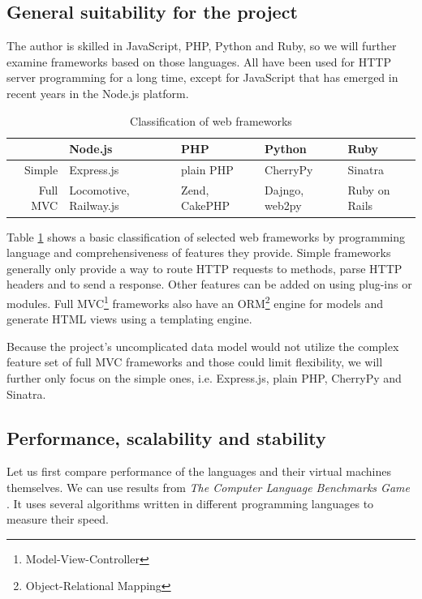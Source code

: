 \documentclass[12pt,oneside]{fithesis}
\begin{document}
	\subsection{General suitability for the project}
		The author is skilled in JavaScript, PHP, Python and Ruby, so we will further examine frameworks based on those languages. All have been used for HTTP server programming for a long time, except for JavaScript that has emerged in recent years in the Node.js platform.\\
		\begin{table}[htb]
		\begin{tabular}{|r||p{2.2cm}|p{2.2cm}|p{2.1cm}|p{2.2cm}|}
			\hline 
			\rule[-1ex]{0pt}{2.5ex} & Node.js & PHP & Python & Ruby \\ 
			\hline\hline
			\rule[-1ex]{0pt}{2.5ex} Simple & Express.js & plain PHP & CherryPy & Sinatra \\ 
			\hline 
			\rule[-1ex]{0pt}{2.5ex} Full MVC & Locomotive, Railway.js & Zend, CakePHP & Dajngo, web2py & Ruby on Rails \\ 
			\hline 
		\end{tabular}
		\caption{Classification of web frameworks}
		\label{table:wf}
		\end{table}
	
		Table \ref{table:wf} shows a basic classification of selected web frameworks by programming language and comprehensiveness of features they provide. Simple frameworks generally only provide a way to route HTTP requests to methods, parse HTTP headers and to send a response. Other features can be added on using plug-ins or modules. Full MVC\footnote{Model-View-Controller} frameworks also have an ORM\footnote{Object-Relational Mapping} engine for models and generate HTML views using a templating engine.
		
		Because the project's uncomplicated data model would not utilize the complex feature set of full MVC frameworks and those could limit flexibility, we will further only focus on the simple ones, i.e. Express.js, plain PHP, CherryPy and Sinatra.
		
	\subsection{Performance, scalability and stability}
		Let us first compare performance of the languages and their virtual machines themselves. We can use results from \emph{The Computer Language Benchmarks Game} \cite{website:bench}. It uses several algorithms written in different programming languages to measure their speed.
		
\end{document}
